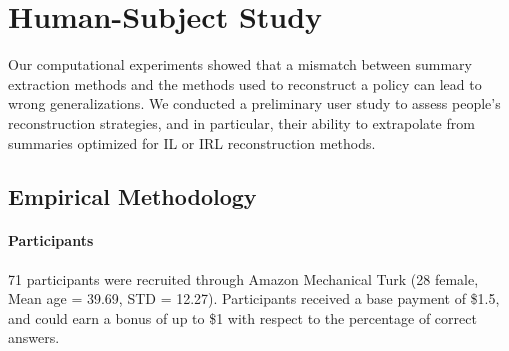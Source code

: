 \documentclass{article}
\begin{document}
\begin{table}[]
\small
{}
\caption{For each summary in Figure~\ref{fig:computationalResults}(b), we compute the reconstruction accuracy with every model with features derived for the other model (i.e. we use the features derived for IRL to do IL and vice versa). No reconstruction model achieves accuracy higher than 0.6.}
\label{fig:featureMismatch}
\vspace{-0.9cm}
\end{table}

\section{Human-Subject Study}
Our computational experiments showed that a mismatch between summary extraction methods and the methods used to reconstruct a policy can lead to wrong generalizations. We conducted a preliminary user study to assess people's reconstruction strategies, and in particular, their ability to extrapolate from summaries optimized for IL or IRL reconstruction methods.

\subsection{Empirical Methodology}
\paragraph{Participants} 71 participants were recruited through Amazon Mechanical Turk (28 female, Mean age = 39.69, STD = 12.27). 
Participants received a base payment of \$1.5, and could earn a bonus of up to \$1 with respect to the percentage of correct answers.
\end{document}
